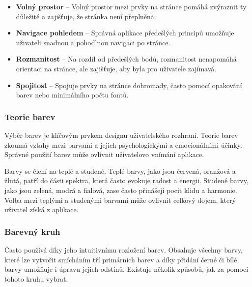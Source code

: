 \begin{itemize}
  \item \textbf{Volný prostor} -- Volný prostor mezi prvky na stránce pomáhá zvýraznit ty důležité a zajišťuje, že stránka není přeplněná.
  \item \textbf{Navigace pohledem} -- Správná aplikace předešlých principů umožňuje uživateli snadnou a pohodlnou navigaci po stránce.
  \item \textbf{Rozmanitost} -- Na rozdíl od předešlých bodů, rozmanitost nenapomáhá orientaci na stránce, ale zajišťuje, aby byla pro uživatele zajímavá.
  \item \textbf{Spojitost} -- Spojuje prvky na stránce dohromady, často pomocí opakování barev nebo minimálního počtu fontů.
\end{itemize}

\subsubsection{Teorie barev}
Výběr barev je klíčovým prvkem designu uživatelského rozhraní. Teorie barev zkoumá vztahy mezi barvami a jejich psychologickými a emocionálními účinky. Správné použití barev může ovlivnit uživatelovo vnímání aplikace.

Barvy se člení na teplé a studené. Teplé barvy, jako jsou červená, oranžová a žlutá, patří do části spektra, která často evokuje radost a energii. Studené barvy, jako jsou zelená, modrá a fialová, zase často přinášejí pocit klidu a harmonie. Volba mezi teplými a studenými barvami může ovlivnit celkový dojem, který uživatel získá z aplikace.

\subsubsection*{Barevný kruh}
Často používá díky jeho intuitivnímu rozložení barev. Obsahuje všechny barvy, které lze vytvořit smícháním tří primárních barev a díky přidání černé či bílé barvy umožňuje i úpravu jejich odstínů. Existuje několik způsobů, jak za pomoci tohoto kruhu vybrat.

